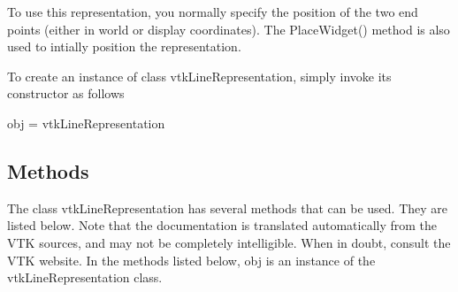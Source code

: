 To use this representation, you normally specify the position of the two end points (either in world or display coordinates). The Place\-Widget() method is also used to intially position the representation.

To create an instance of class vtk\-Line\-Representation, simply invoke its constructor as follows \begin{DoxyVerb}  obj = vtkLineRepresentation
\end{DoxyVerb}
 \hypertarget{vtkwidgets_vtkxyplotwidget_Methods}{}\subsection{Methods}\label{vtkwidgets_vtkxyplotwidget_Methods}
The class vtk\-Line\-Representation has several methods that can be used. They are listed below. Note that the documentation is translated automatically from the V\-T\-K sources, and may not be completely intelligible. When in doubt, consult the V\-T\-K website. In the methods listed below, {\ttfamily obj} is an instance of the vtk\-Line\-Representation class. 
